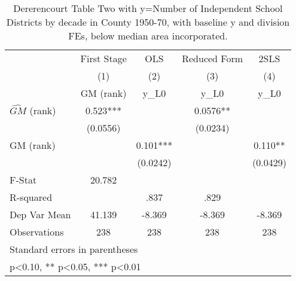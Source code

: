 \begin{table}[htbp]\centering
\def\sym#1{\ifmmode^{#1}\else\(^{#1}\)\fi}
\caption{Dererencourt Table Two with y=Number of Independent School Districts by decade in County 1950-70, with baseline y and division FEs, below median area incorporated.}
\begin{tabular}{l*{4}{c}}
\toprule
                    & First Stage   &         OLS   &Reduced Form   &        2SLS   \\
                    &\multicolumn{1}{c}{(1)}&\multicolumn{1}{c}{(2)}&\multicolumn{1}{c}{(3)}&\multicolumn{1}{c}{(4)}\\
                    &\multicolumn{1}{c}{GM  (rank)}&\multicolumn{1}{c}{y\_L0}&\multicolumn{1}{c}{y\_L0}&\multicolumn{1}{c}{y\_L0}\\
\midrule
$\hat{GM}$ (rank)   &       0.523***&               &      0.0576** &               \\
                    &    (0.0556)   &               &    (0.0234)   &               \\
\addlinespace
GM  (rank)          &               &       0.101***&               &       0.110** \\
                    &               &    (0.0242)   &               &    (0.0429)   \\
\midrule
F-Stat              &      20.782   &               &               &               \\
R-squared           &               &        .837   &        .829   &               \\
Dep Var Mean        &      41.139   &      -8.369   &      -8.369   &      -8.369   \\
Observations        &         238   &         238   &         238   &         238   \\
\bottomrule
\multicolumn{5}{l}{\footnotesize Standard errors in parentheses}\\
\multicolumn{5}{l}{\footnotesize * p<0.10, ** p<0.05, *** p<0.01}\\
\end{tabular}
\end{table}
